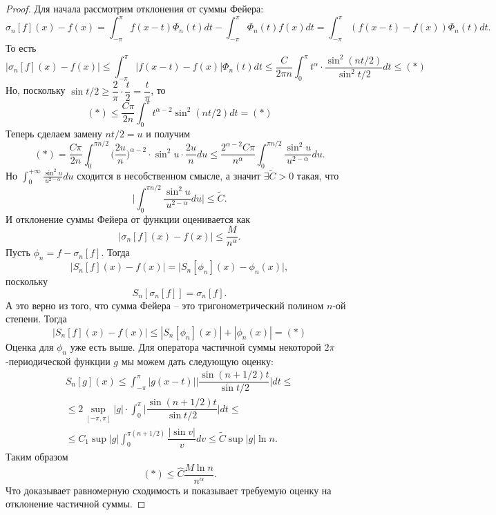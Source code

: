 \begin{proof}
    Для начала рассмотрим отклонения от суммы Фейера:
    \[
        \sigma_n[f](x) - f(x) = \int_{-\pi}^\pi f(x - t)\Phi_n(t)dt - \int_{-\pi}^{\pi}\Phi_n(t)f(x)dt = \int_{-\pi}^{\pi} (f(x - t) - f(x))\Phi_n(t)dt.
    \]
    То есть \[
                |\sigma_n[f](x) - f(x)| \leq \int_{-\pi}^{\pi}|f(x - t) - f(x)|\Phi_n(t)dt \leq \dfrac{C}{2\pi n} \int_{0}^{\pi} t^\alpha \cdot \dfrac{\sin^2 (nt/2)}{\sin^2 t/2}dt \leq (*)
    \]
    Но, поскольку $\sin t/2 \geq \dfrac{2}{\pi} \cdot \dfrac{t}{2} = \dfrac{t}{\pi}$, то \[
                                                                                            (*) \leq \dfrac{C\pi}{2n} \int_0^{\pi} t^{\alpha - 2}\sin^2(nt/2)dt = (*)
    \]
    Теперь сделаем замену $nt/2 = u$ и получим \[
                                                   (*) = \dfrac{C \pi}{2 n} \int_0^{\pi n/2} \biggr(\dfrac{2u}{n}\biggr)^{\alpha - 2}\cdot\sin^2 u\cdot \dfrac{2u}{n}du \leq \dfrac{2^{\alpha - 2}C \pi}{n^\alpha}\int_0^{\pi n / 2} \dfrac{\sin^2 u}{u^{2 - \alpha}}du.
    \]
    Но $\int_0^{+\infty}\frac{\sin^2 u}{u^{2 - \alpha}}du$ сходится в несобственном смысле, а значит $\exists \widetilde{C} > 0$ такая, что \[
                                                                                                                                                \biggr|\int_0^{\pi n / 2}\dfrac{\sin^2 u}{u^{2 - \alpha}}du\biggr| \leq \widetilde{C}.
    \]
    И отклонение суммы Фейера от функции оценивается как \[
                                                             |\sigma_n[f](x) - f(x)| \leq \dfrac{M}{n^\alpha}.
    \]
    Пусть $\phi_n = f -\sigma_n[f]$. Тогда \[
                                               \biggr|S_n[f](x) - f(x)\biggr| = \biggr|S_n[\phi_n](x) - \phi_n(x)\biggr|,
    \]
    поскольку \[
                  S_n[\sigma_n[f]] = \sigma_n[f].
    \]
    А это верно из того, что сумма Фейера -- это тригонометрический полином $n$-ой степени. Тогда \[
                                                                                                      \biggr|S_n[f](x) - f(x)\biggr| \leq |S_n[\phi_n](x)| + |\phi_n(x)| = (*)
    \]
    Оценка для $\phi_n$ уже есть выше.
    Для оператора частичной суммы некоторой $2\pi$-периодической функции $g$ мы можем дать следующую оценку:
    \begin{multline*}
        S_n[g](x) \leq \int_{-\pi}^{\pi}|g(x - t)|\biggr|\dfrac{\sin (n + 1/2)t}{\sin t/2}\biggr|dt \leq \\ \leq 2\sup\limits_{[-\pi, \pi]}|g| \cdot \int_{0}^\pi \biggr|\dfrac{\sin (n + 1/2)t}{\sin t/2}\biggr| dt \leq \\ \leq C_1 \sup |g| \int_0^{\pi (n + 1/2)} \dfrac{|\sin v|}{v}dv \leq \widetilde{C}\sup|g| \ln n.
    \end{multline*}
    Таким образом \[
                      (*) \leq \widehat{C}\dfrac{M\ln n}{n^\alpha}.
    \]
    Что доказывает равномерную сходимость и показывает требуемую оценку на отклонение частичной суммы.
\end{proof}
